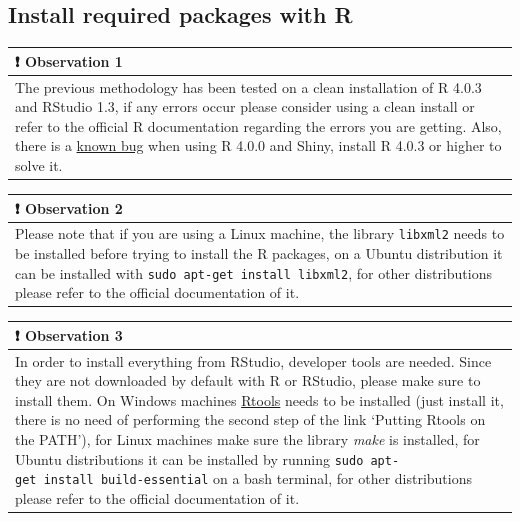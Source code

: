 \documentclass[
]{book}
\begin{document}
\hypertarget{install-required-packages-with-r}{%
\subsection{Install required packages with R}\label{install-required-packages-with-r}}

\begin{longtable}[]{@{}
  >{\raggedright\arraybackslash}p{}@{}}
\toprule
❗ Observation 1 \\
\midrule
\endhead
The previous methodology has been tested on a clean installation of R 4.0.3 and RStudio 1.3, if any errors occur please consider using a clean install or refer to the official R documentation regarding the errors you are getting. Also, there is a \href{https://github.com/RcppCore/Rcpp/issues/1105}{known bug} when using R 4.0.0 and Shiny, install R 4.0.3 or higher to solve it. \\
\bottomrule
\end{longtable}

\begin{longtable}[]{@{}
  >{\raggedright\arraybackslash}p{}@{}}
\toprule
❗ Observation 2 \\
\midrule
\endhead
Please note that if you are using a Linux machine, the library \texttt{libxml2} needs to be installed before trying to install the R packages, on a Ubuntu distribution it can be installed with \texttt{sudo\ apt-get\ install\ libxml2}, for other distributions please refer to the official documentation of it. \\
\bottomrule
\end{longtable}

\begin{longtable}[]{@{}
  >{\raggedright\arraybackslash}p{}@{}}
\toprule
❗ Observation 3 \\
\midrule
\endhead
In order to install everything from RStudio, developer tools are needed. Since they are not downloaded by default with R or RStudio, please make sure to install them. On Windows machines \href{https://cran.r-project.org/bin/windows/Rtools/}{Rtools} needs to be installed (just install it, there is no need of performing the second step of the link `Putting Rtools on the PATH'), for Linux machines make sure the library \emph{make} is installed, for Ubuntu distributions it can be installed by running \texttt{sudo\ apt-get\ install\ build-essential} on a bash terminal, for other distributions please refer to the official documentation of it. \\
\bottomrule
\end{longtable}
\end{document}

